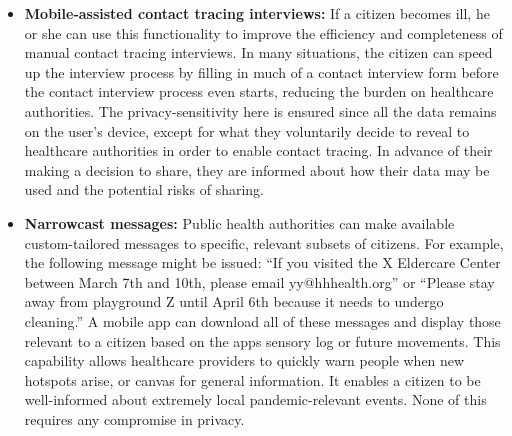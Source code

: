 \documentclass{article}
\begin{document}
\begin{itemize}
\item \textbf{Mobile-assisted contact tracing interviews:}  If a citizen becomes ill, he or she can use this functionality to improve the efficiency and completeness of manual contact tracing interviews.  In many situations, the citizen can speed up the interview process by filling in much of a contact interview form before the contact interview process even starts, reducing the burden on healthcare authorities.  The privacy-sensitivity here is ensured since all the data remains on the user's device, except for what they voluntarily decide to reveal to healthcare authorities in order to enable contact tracing. In advance of their making a decision to share, they are informed about how their data may be used and the potential risks of sharing. 

\item \textbf{Narrowcast messages:}  Public health authorities can make available custom-tailored messages to specific, relevant subsets of citizens.  For example, the following message might be issued: ``If you visited the X Eldercare Center between March 7th and 10th, please email yy@hhhealth.org'' or ``Please stay away from playground Z until April 6th because it needs to undergo cleaning.''  A mobile app can download all of these messages and display those relevant to a citizen based on the apps sensory log or future movements.  This capability allows healthcare providers to quickly warn people when new hotspots arise, or canvas for general information.  It enables a citizen to be well-informed about extremely local pandemic-relevant events.  None of this requires any compromise in privacy.


\end{itemize}
\end{document}
